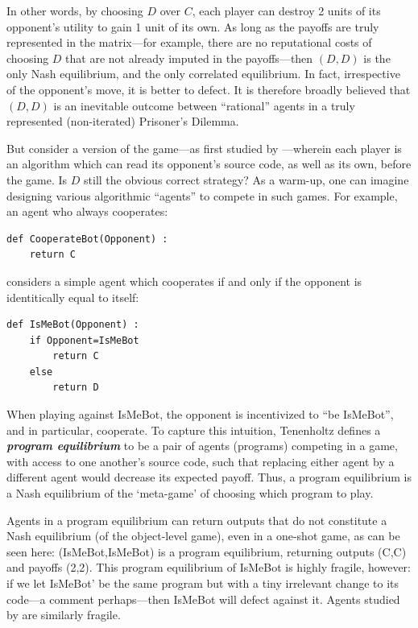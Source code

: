 \documentclass[onecolumn,authordate]{miri-tech-article}
\numberwithin{equation}{section}
\theoremstyle{definition}
\renewcommand{\-}{^{-1}}
\begin{document}
\noindent In other words, by choosing $D$ over $C$, each player can destroy 2 units of its opponent's utility to gain 1 unit of its own.  As long as the payoffs are truly represented in the matrix---for example, there are no reputational costs of choosing $D$ that are not already imputed in the payoffs---then $(D,D)$ is the only Nash equilibrium, and the only correlated equilibrium.  In fact, irrespective of the opponent's move, it is better to defect.  It is therefore broadly believed that $(D,D)$ is an inevitable outcome between ``rational'' agents in a truly represented (non-iterated) Prisoner's Dilemma.  

But consider a version of the game---as first studied by \citet{Tennenholtz:2004:Program}---wherein each player is an algorithm which can read its opponent's source code, as well as its own, before the game.  Is $D$ still the obvious correct strategy?  As a warm-up, one can imagine designing various algorithmic ``agents'' to compete in such games.  For example, an agent who always cooperates:

\begin{Verbatim}[frame=single]
def CooperateBot(Opponent) :
	return C
\end{Verbatim}

\citet{Tennenholtz:2004:Program} considers a simple agent which cooperates if and only if the opponent is identitically equal to itself:

\begin{Verbatim}[frame=single]
def IsMeBot(Opponent) :
	if Opponent=IsMeBot
		return C
	else
		return D
\end{Verbatim}

When playing against IsMeBot, the opponent is incentivized to ``be IsMeBot'', and in particular, cooperate.  To capture this intuition, Tenenholtz defines a {\em \bf program equilibrium} to be a pair of agents (programs) competing in a game, with access to one another's source code, such that replacing either agent by a different agent would decrease its expected payoff.  Thus, a program equilibrium is a Nash equilibrium of the `meta-game' of choosing which program to play.  

Agents in a program equilibrium can return outputs that do not constitute a Nash equilibrium (of the object-level game), even in a one-shot game, as can be seen here: (IsMeBot,IsMeBot) is a program equilibrium, returning outputs (C,C) and payoffs (2,2).  This program equilibrium of IsMeBot is highly fragile, however: if we let IsMeBot' be the same program but with a tiny irrelevant change to its code---a comment perhaps---then IsMeBot will defect against it.  Agents studied by \citet{Fortnow:2009:Program} are similarly fragile.
\end{document}
